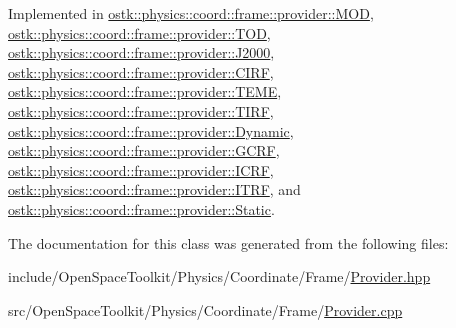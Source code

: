 Implemented in \hyperlink{classostk_1_1physics_1_1coord_1_1frame_1_1provider_1_1_m_o_d_a0b6a40a222857ad032f5d5a8d228ab16}{ostk\+::physics\+::coord\+::frame\+::provider\+::\+M\+OD}, \hyperlink{classostk_1_1physics_1_1coord_1_1frame_1_1provider_1_1_t_o_d_a57f8d993ac693b2cd39b4a99faadc92f}{ostk\+::physics\+::coord\+::frame\+::provider\+::\+T\+OD}, \hyperlink{classostk_1_1physics_1_1coord_1_1frame_1_1provider_1_1_j2000_ab707ff9bba9634b2ce9684ebaad342bf}{ostk\+::physics\+::coord\+::frame\+::provider\+::\+J2000}, \hyperlink{classostk_1_1physics_1_1coord_1_1frame_1_1provider_1_1_c_i_r_f_affec3924a864a0d793ee5aa887a06cf8}{ostk\+::physics\+::coord\+::frame\+::provider\+::\+C\+I\+RF}, \hyperlink{classostk_1_1physics_1_1coord_1_1frame_1_1provider_1_1_t_e_m_e_a8a1c5599411f152c63b69819e89b0464}{ostk\+::physics\+::coord\+::frame\+::provider\+::\+T\+E\+ME}, \hyperlink{classostk_1_1physics_1_1coord_1_1frame_1_1provider_1_1_t_i_r_f_ac7f3d815a45e270adab07bf6f51dc25f}{ostk\+::physics\+::coord\+::frame\+::provider\+::\+T\+I\+RF}, \hyperlink{classostk_1_1physics_1_1coord_1_1frame_1_1provider_1_1_dynamic_ab01d8d9a09df8e46680eb1acb830a86c}{ostk\+::physics\+::coord\+::frame\+::provider\+::\+Dynamic}, \hyperlink{classostk_1_1physics_1_1coord_1_1frame_1_1provider_1_1_g_c_r_f_a02160b74124b3ece74912c62aae5caaa}{ostk\+::physics\+::coord\+::frame\+::provider\+::\+G\+C\+RF}, \hyperlink{classostk_1_1physics_1_1coord_1_1frame_1_1provider_1_1_i_c_r_f_a0d8e56478597e46dbc2c1867e6774398}{ostk\+::physics\+::coord\+::frame\+::provider\+::\+I\+C\+RF}, \hyperlink{classostk_1_1physics_1_1coord_1_1frame_1_1provider_1_1_i_t_r_f_a2f3a53b002d54f1adf829cefc2cf7393}{ostk\+::physics\+::coord\+::frame\+::provider\+::\+I\+T\+RF}, and \hyperlink{classostk_1_1physics_1_1coord_1_1frame_1_1provider_1_1_static_a5b7189d8cff8128fee348af2feac1304}{ostk\+::physics\+::coord\+::frame\+::provider\+::\+Static}.



The documentation for this class was generated from the following files\+:\begin{DoxyCompactItemize}
\item 
include/\+Open\+Space\+Toolkit/\+Physics/\+Coordinate/\+Frame/\hyperlink{_provider_8hpp}{Provider.\+hpp}\item 
src/\+Open\+Space\+Toolkit/\+Physics/\+Coordinate/\+Frame/\hyperlink{_provider_8cpp}{Provider.\+cpp}\end{DoxyCompactItemize}
